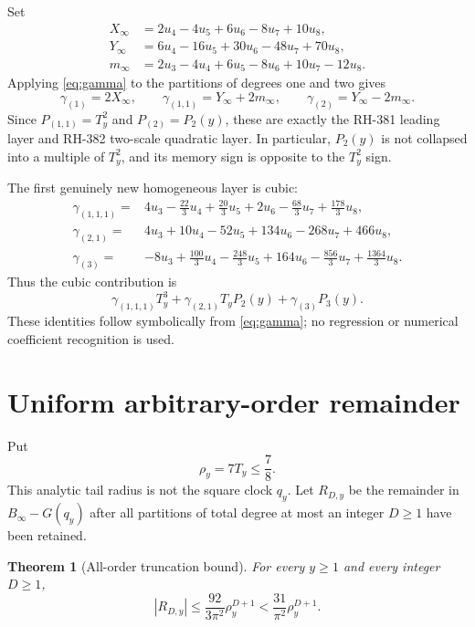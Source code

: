 \documentclass[11pt]{article}
\newtheorem{theorem}{Theorem}[section]
\theoremstyle{definition}
\theoremstyle{remark}
\begin{document}
Set
\begin{align}
 X_\infty&=2u_4-4u_5+6u_6-8u_7+10u_8,\\
 Y_\infty&=6u_4-16u_5+30u_6-48u_7+70u_8,\\
 m_\infty&=2u_3-4u_4+6u_5-8u_6+10u_7-12u_8.
 \label{eq:XYm}
\end{align}
Applying \eqref{eq:gamma} to the partitions of degrees one and two gives
\begin{equation}
 \gamma_{(1)}=2X_\infty,\qquad
 \gamma_{(1,1)}=Y_\infty+2m_\infty,
 \qquad
 \gamma_{(2)}=Y_\infty-2m_\infty.
 \label{eq:low-orders}
\end{equation}
Since $P_{(1,1)}=T_y^2$ and $P_{(2)}=P_2(y)$, these are exactly the
RH-381 leading layer and RH-382 two-scale quadratic layer.  In particular,
$P_2(y)$ is not collapsed into a multiple of $T_y^2$, and its memory sign
is opposite to the $T_y^2$ sign.

The first genuinely new homogeneous layer is cubic:
\begin{align}
 \gamma_{(1,1,1)}={}&4u_3-\frac{22}{3}u_4+\frac{20}{3}u_5+2u_6
 -\frac{68}{3}u_7+\frac{178}{3}u_8,
 \label{eq:cubic111}\\
 \gamma_{(2,1)}={}&4u_3+10u_4-52u_5+134u_6-268u_7+466u_8,
 \label{eq:cubic21}\\
 \gamma_{(3)}={}&-8u_3+\frac{100}{3}u_4-\frac{248}{3}u_5+164u_6
 -\frac{856}{3}u_7+\frac{1364}{3}u_8.
 \label{eq:cubic3}
\end{align}
Thus the cubic contribution is
\[
 \gamma_{(1,1,1)}T_y^3
 +\gamma_{(2,1)}T_yP_2(y)
 +\gamma_{(3)}P_3(y).
\]
These identities follow symbolically from \eqref{eq:gamma}; no regression
or numerical coefficient recognition is used.

\section{Uniform arbitrary-order remainder}

Put
\begin{equation}
 \rho_y=7T_y\le\frac78.
 \label{eq:rho}
\end{equation}
This analytic tail radius is not the square clock $q_y$.  Let
$R_{D,y}$ be the remainder in $B_\infty-G(q_y)$ after all partitions of
total degree at most an integer $D\ge1$ have been retained.

\begin{theorem}[All-order truncation bound]
\label{thm:remainder}
For every $y\ge1$ and every integer $D\ge1$,
\begin{equation}
 \boxed{
 |R_{D,y}|\le\frac{92}{3\pi^2}\rho_y^{D+1}
 <\frac{31}{\pi^2}\rho_y^{D+1}.}
 \label{eq:remainder}
\end{equation}
\end{theorem}
\end{document}
